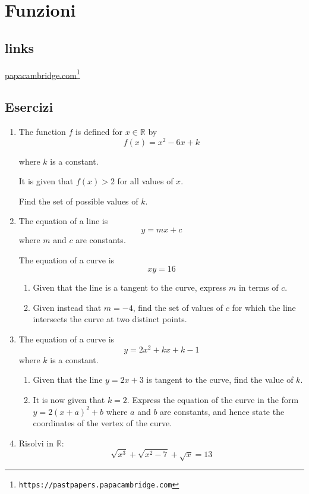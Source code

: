 \section{Funzioni} \label{sec:funzioni}

\subsection{links}


\href{https://pastpapers.papacambridge.com}{papacambridge.com}\footnote{\texttt{https://pastpapers.papacambridge.com}}


\subsection{Esercizi}

\begin{enumerate}
\item  
The function $f$ is defined for $x \in \mathbb{R}$
by 
\[
f(x) = x^2 - 6x + k
\]

where $k$ is a constant.

It is given that $f(x) > 2$ for all values of $x$.

Find the set of possible values of $k$.




\item
The equation of a line is \[ y = mx + c \] where $m$ and $c$ are constants.

The equation of a curve is \[ xy = 16 \]

\begin{enumerate}
\item Given that the line is a tangent to the curve, express $m$ in terms of $c$.
\item Given instead that $m = -4$, find the set of values of $c$ for which the line 
intersects the curve at two distinct points.
\end{enumerate}


\item
The equation of a curve is \[ y=2x^2 + kx + k - 1 \] where $k$ is a constant.

\begin{enumerate}
\item Given that the line $y=2x+3$ is tangent to the curve, find the value of $k$.
\item It is now given that $k=2$.  Express the equation of the curve in the form $y=2(x+a)^2+b$
where $a$ and $b$ are constants, and hence state the coordinates of the vertex of the curve.
\end{enumerate}


\item
Risolvi in $\mathbb{R}$: 
\[ \sqrt{x^3}+\sqrt{x^2-7}+\sqrt{x}=13 \]


\end{enumerate}


